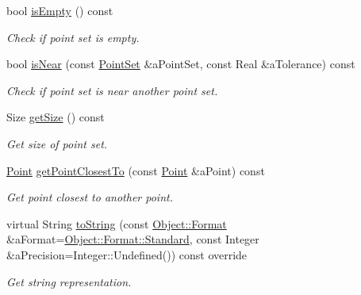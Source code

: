 \begin{DoxyCompactItemize}
bool \hyperlink{classlibrary_1_1math_1_1geom_1_1d2_1_1objects_1_1_point_set_af81b5c7b407db5fc7021f71ab10497ea}{is\+Empty} () const
\begin{DoxyCompactList}\small\item\em Check if point set is empty. \end{DoxyCompactList}\item 
bool \hyperlink{classlibrary_1_1math_1_1geom_1_1d2_1_1objects_1_1_point_set_a8aba7c99e93720ba291abef2ded25cc7}{is\+Near} (const \hyperlink{classlibrary_1_1math_1_1geom_1_1d2_1_1objects_1_1_point_set}{Point\+Set} \&a\+Point\+Set, const Real \&a\+Tolerance) const
\begin{DoxyCompactList}\small\item\em Check if point set is near another point set. \end{DoxyCompactList}\item 
Size \hyperlink{classlibrary_1_1math_1_1geom_1_1d2_1_1objects_1_1_point_set_a7a0cfe0925906d863e0e89605344838d}{get\+Size} () const
\begin{DoxyCompactList}\small\item\em Get size of point set. \end{DoxyCompactList}\item 
\hyperlink{classlibrary_1_1math_1_1geom_1_1d2_1_1objects_1_1_point}{Point} \hyperlink{classlibrary_1_1math_1_1geom_1_1d2_1_1objects_1_1_point_set_a4d4944b034ead53d1b734fe74cd1bc60}{get\+Point\+Closest\+To} (const \hyperlink{classlibrary_1_1math_1_1geom_1_1d2_1_1objects_1_1_point}{Point} \&a\+Point) const
\begin{DoxyCompactList}\small\item\em Get point closest to another point. \end{DoxyCompactList}\item 
virtual String \hyperlink{classlibrary_1_1math_1_1geom_1_1d2_1_1objects_1_1_point_set_a4eeece63192481627cb0f991a4eef1a4}{to\+String} (const \hyperlink{classlibrary_1_1math_1_1geom_1_1d2_1_1_object_ac8cd61dada4960cfee9a469231621b17}{Object\+::\+Format} \&a\+Format=\hyperlink{classlibrary_1_1math_1_1geom_1_1d2_1_1_object_ac8cd61dada4960cfee9a469231621b17aeb6d8ae6f20283755b339c0dc273988b}{Object\+::\+Format\+::\+Standard}, const Integer \&a\+Precision=Integer\+::\+Undefined()) const override
\begin{DoxyCompactList}\small\item\em Get string representation. \end{DoxyCompactList}\item 

\end{DoxyCompactItemize}

